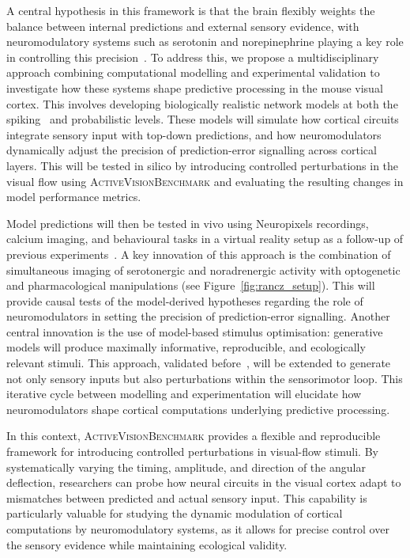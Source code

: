 \documentclass[12pt,a4paper]{article}
\newcommand{\avb}{\textsc{ActiveVisionBenchmark}}  %
\begin{document}
A central hypothesis in this framework is that the brain flexibly weights the balance between internal predictions and external sensory evidence, with neuromodulatory systems such as serotonin and norepinephrine playing a key role in controlling this precision~\parencite{AmbradGiovannettiRancz2024}. To address this, we propose a multidisciplinary approach combining computational modelling and experimental validation to investigate how these systems shape predictive processing in the mouse visual cortex. This involves developing biologically realistic network models at both the spiking~\parencite{Davison2020,GrimaldiPerrinet2023} and probabilistic \parencite{Ladret2023} levels. These models will simulate how cortical circuits integrate sensory input with top-down predictions, and how neuromodulators dynamically adjust the precision of prediction-error signalling across cortical layers. This will be tested in silico by introducing controlled perturbations in the visual flow using \avb{} and evaluating the resulting changes in model performance metrics.

Model predictions will then be tested in vivo using Neuropixels recordings, calcium imaging, and behavioural tasks in a virtual reality setup as a follow-up of previous experiments~\parencite{AmbradGiovannettiRancz2024}. A key innovation of this approach is the combination of simultaneous imaging of serotonergic and noradrenergic activity with optogenetic and pharmacological manipulations (see Figure~\ref{fig:rancz_setup}). This will provide causal tests of the model-derived hypotheses regarding the role of neuromodulators in setting the precision of prediction-error signalling. Another central innovation is the use of model-based stimulus optimisation: generative models will produce maximally informative, reproducible, and ecologically relevant stimuli. This approach, validated before~\parencite{Ladret2023}, will be extended to generate not only sensory inputs but also perturbations within the sensorimotor loop. This iterative cycle between modelling and experimentation will elucidate how neuromodulators shape cortical computations underlying predictive processing.

In this context, \avb{} provides a flexible and reproducible framework for introducing controlled perturbations in visual-flow stimuli. By systematically varying the timing, amplitude, and direction of the angular deflection, researchers can probe how neural circuits in the visual cortex adapt to mismatches between predicted and actual sensory input. This capability is particularly valuable for studying the dynamic modulation of cortical computations by neuromodulatory systems, as it allows for precise control over the sensory evidence while maintaining ecological validity.
\end{document}
